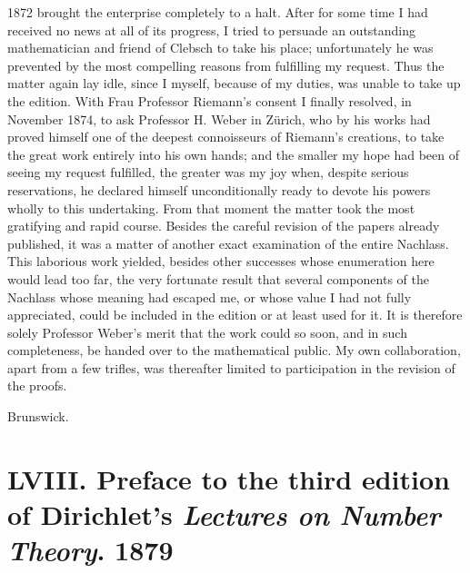 \documentclass[11pt]{article}
\newcommand{\origpage}[1]{\par\vspace{0.25em}\noindent{\footnotesize\itshape [Printed page #1]}\par\vspace{0.25em}}
\begin{document}
\origpage{423}
1872 brought the enterprise completely to a halt. After for some time I had received no news at all of its progress, I tried to persuade an outstanding mathematician and friend of Clebsch to take his place; unfortunately he was prevented by the most compelling reasons from fulfilling my request. Thus the matter again lay idle, since I myself, because of my duties, was unable to take up the edition. With Frau Professor Riemann's consent I finally resolved, in November 1874, to ask Professor H. Weber in Zürich, who by his works had proved himself one of the deepest connoisseurs of Riemann's creations, to take the great work entirely into his own hands; and the smaller my hope had been of seeing my request fulfilled, the greater was my joy when, despite serious reservations, he declared himself unconditionally ready to devote his powers wholly to this undertaking. From that moment the matter took the most gratifying and rapid course. Besides the careful revision of the papers already published, it was a matter of another exact examination of the entire Nachlass. This laborious work yielded, besides other successes whose enumeration here would lead too far, the very fortunate result that several components of the Nachlass whose meaning had escaped me, or whose value I had not fully appreciated, could be included in the edition or at least used for it. It is therefore solely Professor Weber's merit that the work could so soon, and in such completeness, be handed over to the mathematical public. My own collaboration, apart from a few trifles, was thereafter limited to participation in the revision of the proofs.

\begin{flushleft}Brunswick.\end{flushleft}

\origpage{424}
\section*{LVIII. Preface to the third edition of Dirichlet's \textit{Lectures on Number Theory}. 1879}
\end{document}
